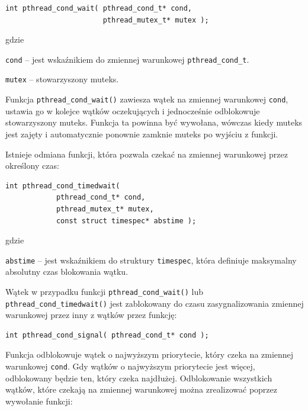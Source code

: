 \begin{lstlisting}[style=MyCStyle]
int pthread_cond_wait( pthread_cond_t* cond,
                       pthread_mutex_t* mutex );
\end{lstlisting}

gdzie

\begin{myitemize}
\item \lstinline[style=MyCStyle]{cond} -- jest wskaźnikiem do zmiennej warunkowej \lstinline[style=MyCStyle]{pthread_cond_t}.
\item \lstinline[style=MyCStyle]{mutex} -- stowarzyszony muteks.
\end{myitemize}

Funkcja \lstinline[style=MyCStyle]{pthread_cond_wait()} zawiesza wątek na zmiennej warunkowej \lstinline[style=MyCStyle]{cond}, ustawia go w kolejce wątków oczekujących i jednocześnie odblokowuje stowarzyszony muteks. Funkcja ta powinna być wywołana, wówczas kiedy muteks jest zajęty i automatycznie ponownie zamknie muteks po wyjściu z funkcji.

Istnieje odmiana funkcji, która pozwala czekać na zmiennej warunkowej przez określony czas:

\begin{lstlisting}[style=MyCStyle]
int pthread_cond_timedwait(
            pthread_cond_t* cond,
            pthread_mutex_t* mutex,
            const struct timespec* abstime );
\end{lstlisting}

gdzie
\begin{myitemize}
\item \lstinline[style=MyCStyle]{abstime} -- jest wskaźnikiem do struktury \lstinline[style=MyCStyle]{timespec}, która definiuje maksymalny absolutny czas blokowania wątku.
\end{myitemize}

Wątek w przypadku funkcji \lstinline[style=MyCStyle]{pthread_cond_wait()} lub \lstinline[style=MyCStyle]{pthread_cond_timedwait()} jest zablokowany do czasu zasygnalizowania zmiennej warunkowej przez  inny z wątków przez funkcję:

\begin{lstlisting}[style=MyCStyle]
int pthread_cond_signal( pthread_cond_t* cond );
\end{lstlisting}

Funkcja odblokowuje wątek o najwyższym priorytecie, który czeka na zmiennej warunkowej \lstinline[style=MyCStyle]{cond}. Gdy wątków o najwyższym priorytecie jest więcej, odblokowany będzie ten, który czeka najdłużej. Odblokowanie wszystkich wątków, które czekają na zmiennej warunkowej można zrealizować poprzez wywołanie funkcji:

